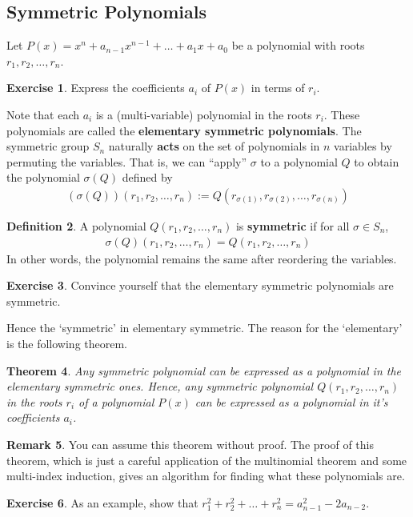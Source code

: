 \documentclass[reqno, 12pt, letter]{article}
\theoremstyle{plain}
\newtheorem{theorem}{Theorem}[section]
\theoremstyle{definition}
\newtheorem{definition}[theorem]{Definition}
\newtheorem{remark}[theorem]{Remark}
\newtheorem{exercise}[theorem]{Exercise}
\theoremstyle{remark}
\numberwithin{equation}{section}
\begin{document}
	\subsection{Symmetric Polynomials}	
	
	Let $ P(x) = x^n + a_{n-1} x^{n-1} + \dots + a_1 x + a_0$ be a polynomial with roots $ r_1, r_2, \dots, r_n$.
	
	\begin{exercise}
		Express the coefficients $ a_i$ of $ P(x)$ in terms of $ r_i$.
	\end{exercise}
	Note that each $ a_i$ is a (multi-variable) polynomial in the roots $ r_i$. These polynomials are called the \textbf{elementary symmetric polynomials}.
	The symmetric group $ S_n$ naturally \textbf{acts} on the set of polynomials in $ n$ variables by permuting the variables. 
	That is, we can ``apply'' $\sigma$ to a polynomial $Q$ to obtain the polynomial $\sigma(Q)$ defined by
		\begin{align*}
			(\sigma(Q))(r_1, r_2, \dots, r_n) := Q(r_{\sigma(1)}, r_{\sigma(2)}, \dots, r_{\sigma(n)})
		\end{align*}
		\begin{definition}
			\label{definition:}
			A polynomial $Q(r_1, r_2, \dots, r_n)$ is {\bf symmetric} if for all $\sigma \in S_n $, 
	\begin{align*}
		\sigma(Q) (r_1, r_2, \dots, r_n)= Q(r_1, r_2, \dots, r_n)
	\end{align*}
	In other words, the polynomial remains the same after reordering the variables.
		\end{definition}
		
	\begin{exercise}
		Convince yourself that the elementary symmetric polynomials are symmetric.
	\end{exercise}
	
	Hence the `symmetric' in elementary symmetric. The reason for the `elementary' is the following theorem. 
	
	\begin{theorem}
		\label{theorem:fundamental_theorem_symmetric_polynomials}
		Any symmetric polynomial can be expressed as a polynomial in the elementary symmetric ones. 
		Hence, any symmetric polynomial $ Q(r_1, r_2, \dots, r_n)$ in the roots $ r_i$ of a polynomial $ P(x)$ can be expressed as a polynomial in it's coefficients $ a_i$.
	\end{theorem}
	\begin{remark}
		You can assume this theorem without proof. The proof of this theorem, which is just a careful application of the multinomial theorem and some multi-index induction, gives an algorithm for finding what these polynomials are.
	\end{remark}
	\begin{exercise}
		As an example, show that $ r_1^2 + r_2^2 + \dots + r_n^2  = a_{n-1}^2 - 2 a_{n-2}$.
	\end{exercise}
	
\end{document}
